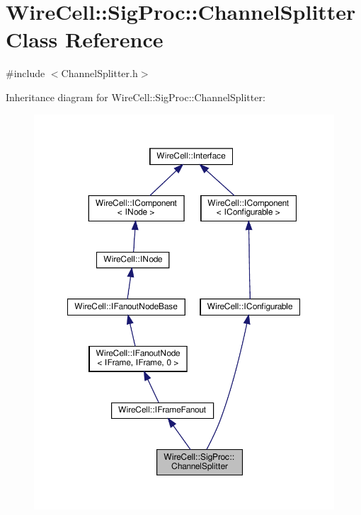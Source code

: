 \hypertarget{class_wire_cell_1_1_sig_proc_1_1_channel_splitter}{}\section{Wire\+Cell\+:\+:Sig\+Proc\+:\+:Channel\+Splitter Class Reference}
\label{class_wire_cell_1_1_sig_proc_1_1_channel_splitter}


{\ttfamily \#include $<$Channel\+Splitter.\+h$>$}



Inheritance diagram for Wire\+Cell\+:\+:Sig\+Proc\+:\+:Channel\+Splitter\+:
\nopagebreak
\begin{figure}[H]
\begin{center}
\leavevmode
\includegraphics[width=350pt]{class_wire_cell_1_1_sig_proc_1_1_channel_splitter__inherit__graph}
\end{center}
\end{figure}


